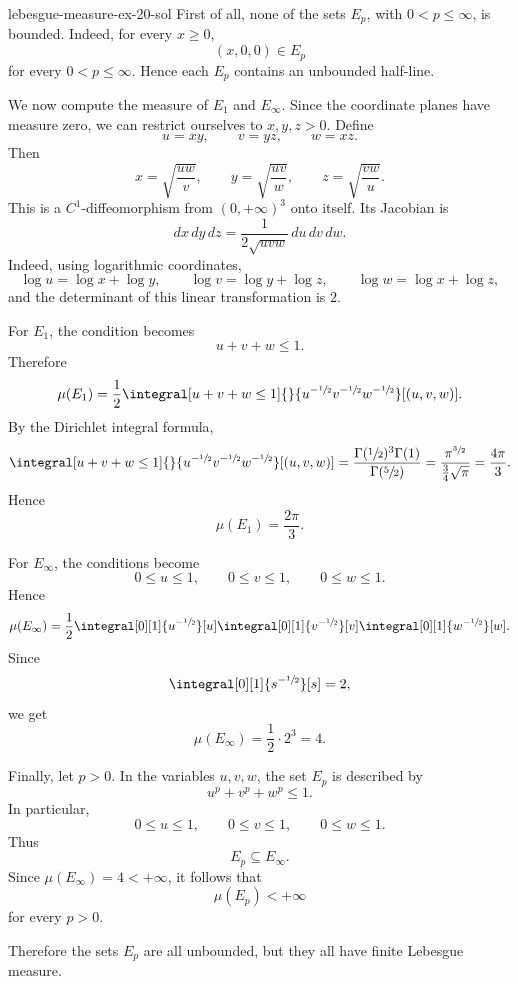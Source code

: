 \documentclass[preview]{standalone}
\begin{document}
\begin{snippetsolution}{lebesgue-measure-ex-20-sol}{}
    First of all, none of the sets \(E_p\), with \(0<p\leq\infty\), is bounded.
    Indeed, for every \(x\geq0\),
    \[
        (x,0,0)\in E_p
    \]
    for every \(0<p\leq\infty\). Hence each \(E_p\) contains an unbounded
    half-line.

    We now compute the measure of \(E_1\) and \(E_\infty\). Since the coordinate
    planes have measure zero, we can restrict ourselves to \(x,y,z>0\). Define
    \[
        u=xy,\qquad v=yz,\qquad w=xz.
    \]
    Then
    \[
        x=\sqrt{\frac{uw}{v}},
        \qquad
        y=\sqrt{\frac{uv}{w}},
        \qquad
        z=\sqrt{\frac{vw}{u}}.
    \]
    This is a \(C^1\)-diffeomorphism from \((0,+\infty)^3\) onto itself. Its
    Jacobian is
    \[
        dx\,dy\,dz
        =
        \frac{1}{2\sqrt{uvw}}\,du\,dv\,dw.
    \]
    Indeed, using logarithmic coordinates,
    \[
        \log u=\log x+\log y,\qquad
        \log v=\log y+\log z,\qquad
        \log w=\log x+\log z,
    \]
    and the determinant of this linear transformation is \(2\).

    For \(E_1\), the condition becomes
    \[
        u+v+w\leq1.
    \]
    Therefore
    \[
        \mu(E_1)
        =
        \frac12
        \integral[u+v+w\leq1]{}{
            u^{-\sfrac12}v^{-\sfrac12}w^{-\sfrac12}
        }[(u,v,w)].
    \]
    By the Dirichlet integral formula,
    \[
        \integral[u+v+w\leq1]{}{
            u^{-\sfrac12}v^{-\sfrac12}w^{-\sfrac12}
        }[(u,v,w)]
        =
        \frac{\Gamma(\sfrac12)^3\Gamma(1)}{\Gamma(\sfrac52)}
        =
        \frac{\pi^{\sfrac32}}{\frac34\sqrt\pi}
        =
        \frac{4\pi}{3}.
    \]
    Hence
    \[
        \mu(E_1)=\frac{2\pi}{3}.
    \]

    For \(E_\infty\), the conditions become
    \[
        0\leq u\leq1,
        \qquad
        0\leq v\leq1,
        \qquad
        0\leq w\leq1.
    \]
    Hence
    \[
        \mu(E_\infty)
        =
        \frac12
        \integral[0][1]{u^{-\sfrac12}}[u]
        \integral[0][1]{v^{-\sfrac12}}[v]
        \integral[0][1]{w^{-\sfrac12}}[w].
    \]
    Since
    \[
        \integral[0][1]{s^{-\sfrac12}}[s]=2,
    \]
    we get
    \[
        \mu(E_\infty)
        =
        \frac12\cdot 2^3
        =
        4.
    \]

    Finally, let \(p>0\). In the variables \(u,v,w\), the set \(E_p\) is
    described by
    \[
        u^p+v^p+w^p\leq1.
    \]
    In particular,
    \[
        0\leq u\leq1,\qquad 0\leq v\leq1,\qquad 0\leq w\leq1.
    \]
    Thus
    \[
        E_p\subseteq E_\infty.
    \]
    Since \(\mu(E_\infty)=4<+\infty\), it follows that
    \[
        \mu(E_p)<+\infty
    \]
    for every \(p>0\).

    Therefore the sets \(E_p\) are all unbounded, but they all have finite
    Lebesgue measure.
\end{snippetsolution}
\end{document}
